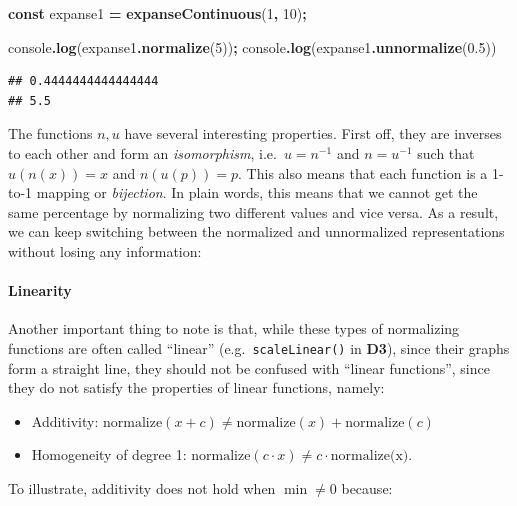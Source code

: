 \documentclass[
]{book}
\newenvironment{Shaded}{\begin{snugshade}}{\end{snugshade}}
\newcommand{\BuiltInTok}[1]{#1}
\newcommand{\DecValTok}[1]{\textcolor[rgb]{0.00,0.00,0.81}{#1}}
\newcommand{\FloatTok}[1]{\textcolor[rgb]{0.00,0.00,0.81}{#1}}
\newcommand{\FunctionTok}[1]{\textcolor[rgb]{0.13,0.29,0.53}{\textbf{#1}}}
\newcommand{\KeywordTok}[1]{\textcolor[rgb]{0.13,0.29,0.53}{\textbf{#1}}}
\newcommand{\NormalTok}[1]{#1}
\newcommand{\OperatorTok}[1]{\textcolor[rgb]{0.81,0.36,0.00}{\textbf{#1}}}
\providecommand{\tightlist}{%
  \setlength{\itemsep}{0pt}\setlength{\parskip}{0pt}}
\theoremstyle{definition}
\theoremstyle{definition}
\theoremstyle{definition}
\theoremstyle{definition}
\theoremstyle{remark}
\begin{document}
\begin{Shaded}
\begin{Highlighting}[]
\KeywordTok{const}\NormalTok{ expanse1 }\OperatorTok{=} \FunctionTok{expanseContinuous}\NormalTok{(}\DecValTok{1}\OperatorTok{,} \DecValTok{10}\NormalTok{)}\OperatorTok{;}

\BuiltInTok{console}\OperatorTok{.}\FunctionTok{log}\NormalTok{(expanse1}\OperatorTok{.}\FunctionTok{normalize}\NormalTok{(}\DecValTok{5}\NormalTok{))}\OperatorTok{;}
\BuiltInTok{console}\OperatorTok{.}\FunctionTok{log}\NormalTok{(expanse1}\OperatorTok{.}\FunctionTok{unnormalize}\NormalTok{(}\FloatTok{0.5}\NormalTok{))}
\end{Highlighting}
\end{Shaded}

\begin{verbatim}
## 0.4444444444444444
## 5.5
\end{verbatim}

The functions \(n, u\) have several interesting properties. First off, they are inverses to each other and form an \emph{isomorphism}, i.e.~\(u = n^{-1}\) and \(n = u^{-1}\) such that \(u(n(x)) = x\) and \(n(u(p)) = p\). This also means that each function is a 1-to-1 mapping or \emph{bijection}. In plain words, this means that we cannot get the same percentage by normalizing two different values and vice versa. As a result, we can keep switching between the normalized and unnormalized representations without losing any information:

\paragraph{Linearity}\label{linearity}

Another important thing to note is that, while these types of normalizing functions are often called ``linear'' (e.g.~\texttt{scaleLinear()} in \textbf{D3}), since their graphs form a straight line, they should not be confused with ``linear functions'', since they do not satisfy the properties of linear functions, namely:

\begin{itemize}
\tightlist
\item
  Additivity: \(\text{normalize}(x + c) \neq \text{normalize}(x) + \text{normalize}(c)\)
\item
  Homogeneity of degree 1: \(\text{normalize}(c \cdot x) \neq c \cdot \text{normalize(x)}\).
\end{itemize}

To illustrate, additivity does not hold when \(\min \neq 0\) because:
\end{document}
